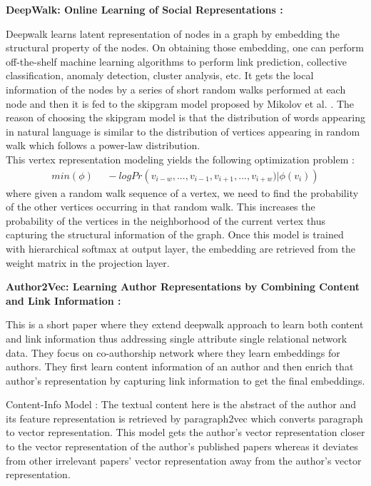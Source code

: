 \begin{flushleft}
\textbf{DeepWalk: Online Learning of Social Representations\cite{deepwalk} :}
\end{flushleft}

Deepwalk learns latent representation of nodes in a graph by embedding the structural property of the nodes. On obtaining those embedding, one can perform off-the-shelf machine learning algorithms to perform link prediction, collective classification, anomaly detection, cluster analysis, etc. It gets the local information of the nodes by a series of short random walks performed at each node and then it is fed to the skipgram model proposed by Mikolov et al. \cite{word2vec, word2vec2}. The reason of choosing the  skipgram model is that the distribution of words appearing in natural language is similar to the distribution of vertices appearing in random walk which follows a power-law distribution.\\ This vertex representation modeling yields the following optimization problem :
\begin{align*}
min (\phi)~~~~~~- log Pr({v_{i-w},...,v_{i-1},v_{i+1},...,v_{i+w})}|\phi(v_i))
\end{align*}
where given a random walk sequence of a vertex, we need to find the probability of the other vertices occurring in that random walk. This increases the probability of the vertices in the neighborhood of the current vertex thus capturing the structural information of the graph. Once this model is trained with hierarchical softmax at output layer, the embedding are retrieved from the weight matrix in the projection layer.

\begin{flushleft}
\textbf{Author2Vec: Learning Author Representations by Combining Content and Link Information \cite{author2vec} :}
\end{flushleft}

This is a short paper where they extend deepwalk \cite{deepwalk} approach to learn both content and link information thus addressing single attribute single relational network data. They focus on co-authorship network where they learn embeddings for authors. They first learn content information of an author and then enrich that author's representation by capturing link information to get the final embeddings.

Content-Info Model : The textual content here is the abstract of the author and its feature representation is retrieved by paragraph2vec \cite{paragraph2vec} which converts paragraph to vector representation. This model gets the author's vector representation closer to the vector representation of the author's published papers whereas it deviates from other irrelevant papers' vector representation away from the author's vector representation.

